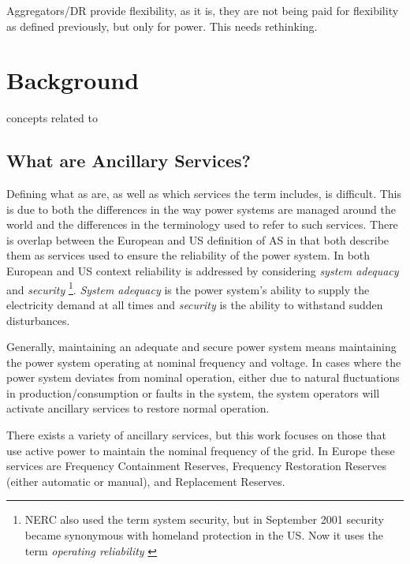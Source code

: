 Aggregators/DR provide flexibility, as it is, they are not being paid for flexibility as defined previously, but only for power. This needs rethinking.
\section{Background} %
 concepts related to 
\label{sec:backgroundservices}
\subsection{What are Ancillary Services?} %
\label{sub:ancillaryservicesdef}
Defining what \gls{as} are, as well as which services the term includes, is difficult. This is due to both the differences in the way power systems are managed around the world and the differences in the terminology used to refer to such services. There is overlap between the European and US definition of AS in that both describe them as services used to ensure the reliability of the power system. In both European and US context reliability is addressed by considering \emph{system adequacy} and \emph{security} \footnote{NERC also used the term system security, but in September 2001 security became synonymous with homeland protection in the US. Now it uses the term \emph{operating reliability} \cite{nerc2007definition}}. \emph{System adequacy} is the power system's ability to supply the electricity demand at all times and \emph{security} is the ability to withstand sudden disturbances.

Generally, maintaining an adequate and secure power system means maintaining the power system operating at nominal frequency and voltage. In cases where the power system deviates from nominal operation, either due to natural fluctuations in production/consumption or faults in the system, the system operators will activate ancillary services to restore normal operation. 

There exists a variety of ancillary services, but this work focuses on those that use active power to maintain the nominal frequency of the grid. In Europe these services are Frequency Containment Reserves, Frequency Restoration Reserves (either automatic or manual), and Replacement Reserves.
